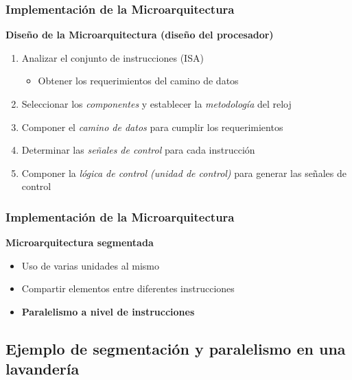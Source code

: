 \documentclass[aspectratio=169,compress]{beamer}
\begin{document}
\begin{footnotesize}
\begin{frame}
\begin{tabular}{cl}
\end{tabular}
\end{frame}





\begin{frame}
\frametitle{Implementación de la Microarquitectura}
\begin{center}\textbf{Diseño de la Microarquitectura (diseño del procesador)}\end{center}
\begin{enumerate}
\item Analizar el conjunto de instrucciones (ISA)
\begin{itemize}
\item Obtener los requerimientos del camino de datos
\end{itemize}
\item Seleccionar los \textit{componentes} y establecer la \textit{metodología} del reloj
\item Componer el \textit{camino de datos} para cumplir los requerimientos
\item Determinar las \textit{señales de control} para cada instrucción
\item Componer la \textit{lógica de control (unidad de control)} para generar las señales de control
\end{enumerate}
\end{frame}



\begin{frame}
\frametitle{Implementación de la Microarquitectura}
\begin{center}\textbf{Microarquitectura segmentada }\end{center}
\begin{itemize}
\item Uso de varias unidades al mismo
\item Compartir elementos entre diferentes instrucciones
\item \textbf{Paralelismo a nivel de instrucciones}
\end{itemize}
\end{frame}



\subsection{Ejemplo de segmentación y paralelismo en una lavandería}


\end{footnotesize}
\end{document}
